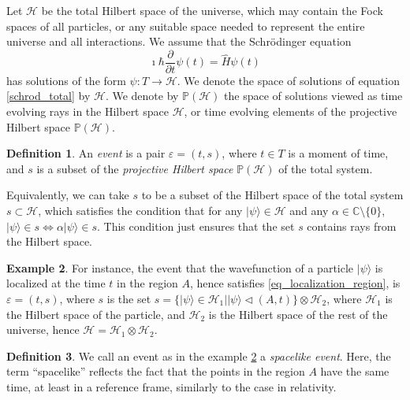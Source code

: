 \documentclass[12pt]{amsart}
\theoremstyle{definition}
\newtheorem{definition}{Definition}[section]
\newtheorem{example}[definition]{Example}
\theoremstyle{plain}
\begin{document}
Let $\mathcal{H}$ be the total Hilbert space of the universe, which may contain the Fock spaces of all particles, or any suitable space needed to represent the entire universe and all interactions.
We assume that the Schr\"odinger equation
\begin{equation}
\label{schrod_total}
\imath\hbar\frac{\partial}{\partial t}\psi(t)=\hat H \psi(t)
\end{equation}
has solutions of the form $\psi:T\to\mathcal{H}$. We denote the space of solutions of equation \eqref{schrod_total} by
$\mathscr{H}$. 
We denote by $\mathbb P(\mathscr{H})$ the space of solutions viewed as time evolving rays in the Hilbert space $\mathcal{H}$, or time evolving elements of the projective Hilbert space $\mathbb P(\mathcal{H})$.

\begin{definition}
\label{def:event_temporal}
An \emph{event} is a pair $\varepsilon=(t,s)$, where $t\in T$ is a moment of time, and $s$ is a subset of the \emph{projective Hilbert space} $\mathbb P(\mathcal{H})$ of the total system.
\end{definition}

Equivalently, we can take $s$ to be a subset of the Hilbert space of the total system $s\subset\mathcal{H}$, which satisfies the condition that for any $|{\psi}\rangle\in\mathcal{H}$ and any $\alpha\in\mathbb{C}\setminus\{0\}$, $|{\psi}\rangle\in s\Leftrightarrow\alpha|{\psi}\rangle\in s$. This condition just ensures that the set $s$ contains rays from the Hilbert space. 

\begin{example}
\label{ex:event_localized}
For instance, the event that the wavefunction of a particle $|{\psi}\rangle$ is localized at the time $t$ in the region $A$, hence satisfies \eqref{eq_localization_region}, is $\varepsilon=(t,s)$, where $s$ is the set $s=\{|{\psi}\rangle\in\mathcal{H}_1||{\psi}\rangle\triangleleft(A,t)\}\otimes\mathcal{H}_2$, where $\mathcal{H}_1$ is the Hilbert space of the particle, and $\mathcal{H}_2$ is the Hilbert space of the rest of the universe, hence $\mathcal{H}=\mathcal{H}_1\otimes\mathcal{H}_2$.
\end{example}

\begin{definition}
We call an event as in the example \ref{ex:event_localized} a \emph{spacelike event}. Here, the term ``spacelike'' reflects the fact that the points in the region $A$ have the same time, at least in a reference frame, similarly to the case in relativity.
\end{definition}
\end{document}

